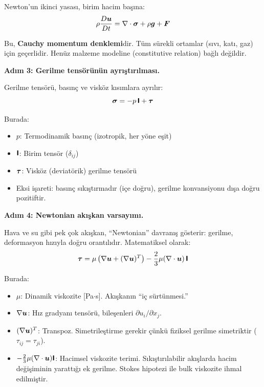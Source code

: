 Newton'un ikinci yasası, birim hacim başına:
\begin{equation}
    \rho \frac{D \bm{u}}{Dt} = \nabla \cdot\bm{\mathsf{\sigma}} + \rho\bm{g} + \bm{F}
    \label{eq:cauchy}
\end{equation}

Bu, \textbf{Cauchy momentum denklemi}dir. Tüm sürekli ortamlar (sıvı, katı, gaz) için geçerlidir. Henüz malzeme modeline (constitutive relation) bağlı değildir.

\textbf{Adım 3: Gerilme tensörünün ayrıştırılması.}

Gerilme tensörü, basınç ve visköz kısımlara ayrılır:
\begin{equation}
    \bm{\mathsf{\sigma}} = -p\,\bm{\mathsf{I}} + \bm{\mathsf{\tau}}
    \label{eq:stress_decomposition}
\end{equation}

Burada:
\begin{itemize}
    \item $p$: Termodinamik basınç (izotropik, her yöne eşit)
    \item $\bm{\mathsf{I}}$: Birim tensör ($\delta_{ij}$)
    \item $\bm{\mathsf{\tau}}$: Visköz (deviatörik) gerilme tensörü
    \item Eksi işareti: basınç sıkıştırmadır (içe doğru), gerilme konvansiyonu dışa doğru pozitiftir.
\end{itemize}

\textbf{Adım 4: Newtonian akışkan varsayımı.}

Hava ve su gibi pek çok akışkan, ``Newtonian'' davranış gösterir: gerilme, deformasyon hızıyla doğru orantılıdır. Matematiksel olarak:
\begin{equation}
    \bm{\mathsf{\tau}} = \mu\left(\nabla\bm{u} + (\nabla\bm{u})^T\right) - \frac{2}{3}\mu(\nabla \cdot\bm{u})\,\bm{\mathsf{I}}
    \label{eq:newtonian_stress}
\end{equation}

Burada:
\begin{itemize}
    \item $\mu$: Dinamik viskozite [Pa$\cdot$s]. Akışkanın ``iç sürtünmesi.''
    \item $\nabla\bm{u}$: Hız gradyanı tensörü, bileşenleri $\partial u_i / \partial x_j$.
    \item $(\nabla\bm{u})^T$: Transpoz. Simetrileştirme gerekir çünkü fiziksel gerilme simetriktir ($\tau_{ij} = \tau_{ji}$).
    \item $-\frac{2}{3}\mu(\nabla \cdot\bm{u})\bm{\mathsf{I}}$: Hacimsel viskozite terimi. Sıkıştırılabilir akışlarda hacim değişiminin yarattığı ek gerilme. Stokes hipotezi ile bulk viskozite ihmal edilmiştir.
\end{itemize}

